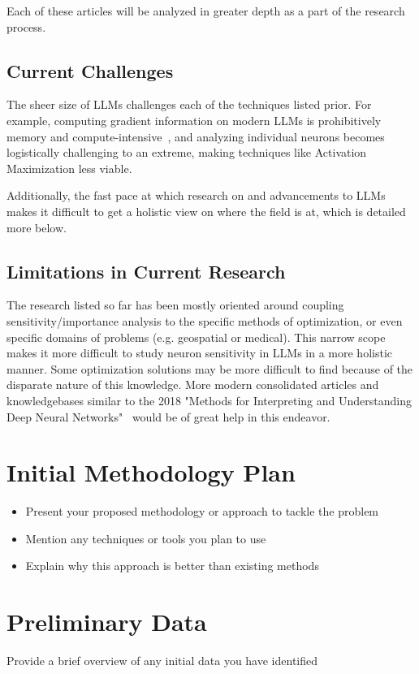 \documentclass{article}
\begin{document}
Each of these articles will be analyzed in greater depth as a part of the research process.

\subsection*{Current Challenges}

The sheer size of LLMs challenges each of the techniques listed prior.
For example, computing gradient information on modern LLMs is prohibitively memory and compute-intensive~\cite{muralidharan2024compact}, and analyzing individual neurons becomes logistically challenging to an extreme, making techniques like Activation Maximization less viable.

Additionally, the fast pace at which research on and advancements to LLMs makes it difficult to get a holistic view on where the field is at, which is detailed more below.

\subsection*{Limitations in Current Research}
The research listed so far has been mostly oriented around coupling sensitivity/importance analysis to the specific methods of optimization, or even specific domains of problems (e.g. geospatial or medical).
This narrow scope makes it more difficult to study neuron sensitivity in LLMs in a more holistic manner.
Some optimization solutions may be more difficult to find because of the disparate nature of this knowledge.
More modern consolidated articles and knowledgebases similar to the 2018 "Methods for Interpreting and Understanding Deep Neural Networks"~\cite{montavon2018methods} would be of great help in this endeavor.

\section*{Initial Methodology Plan}
\begin{itemize}
    \item Present your proposed methodology or approach to tackle the problem
    \item Mention any techniques or tools you plan to use
    \item Explain why this approach is better than existing methods
\end{itemize}


\section*{Preliminary Data}
Provide a brief overview of any initial data you have identified
\end{document}
